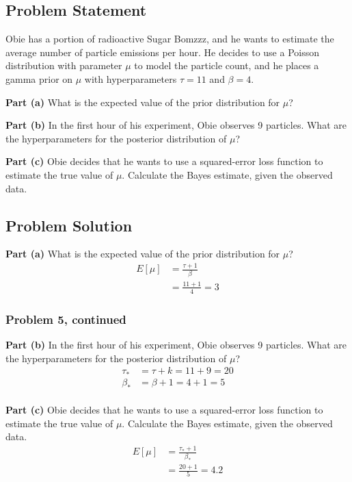 \documentclass[12pt]{article}
\theoremstyle{definition}
\begin{document}
\subsection*{Problem Statement}

Obie has a portion of radioactive Sugar Bomzzz, and he wants to estimate the average number of particle emissions per hour. He decides to use a Poisson distribution with parameter $\mu$ to model the particle count, and he places a gamma prior on $\mu$ with hyperparameters $\tau = 11$ and $\beta = 4$.

\bigskip
\noindent
{\bf Part (a)} What is the expected value of the prior distribution for $\mu$?

\bigskip
\noindent
{\bf Part (b)} In the first hour of his experiment, Obie observes 9 particles. What are the hyperparameters for the posterior distribution of $\mu$?

\bigskip
\noindent
{\bf Part (c)} Obie decides that he wants to use a squared-error loss function to estimate the true value of $\mu$. Calculate the Bayes estimate, given the observed data.


\subsection*{Problem Solution}

\noindent
{\bf Part (a)} What is the expected value of the prior distribution for $\mu$?
\begin{align*}
E[\mu] &= \frac{\tau + 1}{\beta}\\
&= \frac{11 + 1}{4} = 3
\end{align*}
\newpage
\subsubsection*{Problem 5, continued}

\noindent
{\bf Part (b)} In the first hour of his experiment, Obie observes 9 particles. What are the hyperparameters for the posterior distribution of $\mu$?
\begin{align*}
\tau_* &= \tau + k = 11 + 9 = 20\\
\beta_* &= \beta + 1 = 4 + 1 = 5\\
\end{align*}

\noindent
{\bf Part (c)} Obie decides that he wants to use a squared-error loss function to estimate the true value of $\mu$. Calculate the Bayes estimate, given the observed data.
\begin{align*}
E[\mu] &= \frac{\tau_* + 1}{\beta_*}\\
&= \frac{20 + 1}{5} = 4.2
\end{align*}
\end{document}
